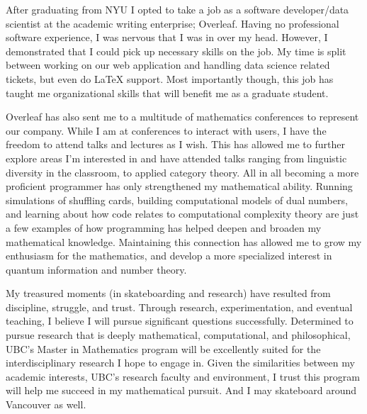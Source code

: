 \documentclass[11pt]{article}
\begin{document}
After graduating from NYU I opted to take a job as a software developer/data scientist at the academic writing enterprise; Overleaf. Having no professional software experience, I was nervous that I was in over my head. However, I demonstrated that I could pick up necessary skills on the job. My time is split between working on our web application and handling data science related tickets, but even do \LaTeX{} support. Most importantly though, this job has taught me organizational skills that will benefit me as a graduate student. 

Overleaf has also sent me to a multitude of mathematics conferences to represent our company. While I am at conferences to interact with users, I have the freedom to attend talks and lectures as I wish. This has allowed me to further explore areas I'm interested in and have attended talks ranging from linguistic diversity in the classroom, to applied category theory. All in all becoming a more proficient programmer has only strengthened my mathematical ability. Running simulations of shuffling cards, building computational models of dual numbers, and learning about how code relates to computational complexity theory are just a few examples of how programming has helped deepen and broaden my mathematical knowledge. Maintaining this connection has allowed me to grow my enthusiasm for the mathematics, and develop a more specialized interest in quantum information and number theory.

My treasured moments (in skateboarding and research) have resulted from discipline, struggle, and trust. Through research, experimentation, and eventual teaching, I believe I will pursue significant questions successfully. Determined to pursue research that is deeply mathematical, computational, and philosophical, UBC's Master in Mathematics program will be excellently suited for the interdisciplinary research I hope to engage in. Given the similarities between my academic interests, UBC’s research faculty and environment, I trust this program will help me succeed in my mathematical pursuit. And I may skateboard around Vancouver as well.
\end{document}

